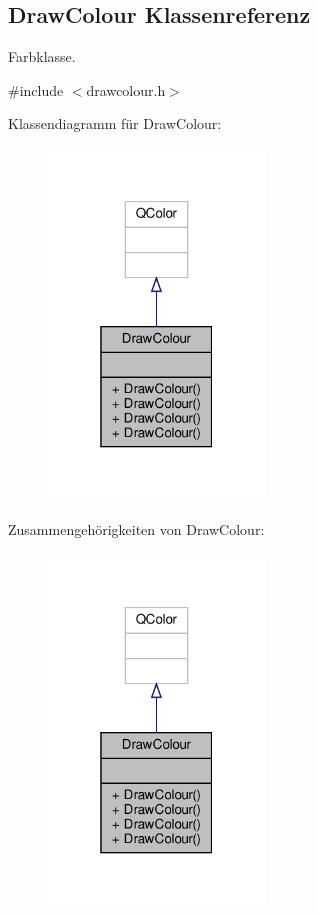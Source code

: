 \hypertarget{classDrawColour}{}\subsection{Draw\+Colour Klassenreferenz}
\label{classDrawColour}


Farbklasse.  




{\ttfamily \#include $<$drawcolour.\+h$>$}



Klassendiagramm für Draw\+Colour\+:
\nopagebreak
\begin{figure}[H]
\begin{center}
\leavevmode
\includegraphics[width=163pt]{classDrawColour__inherit__graph}
\end{center}
\end{figure}


Zusammengehörigkeiten von Draw\+Colour\+:
\nopagebreak
\begin{figure}[H]
\begin{center}
\leavevmode
\includegraphics[width=163pt]{classDrawColour__coll__graph}
\end{center}
\end{figure}
